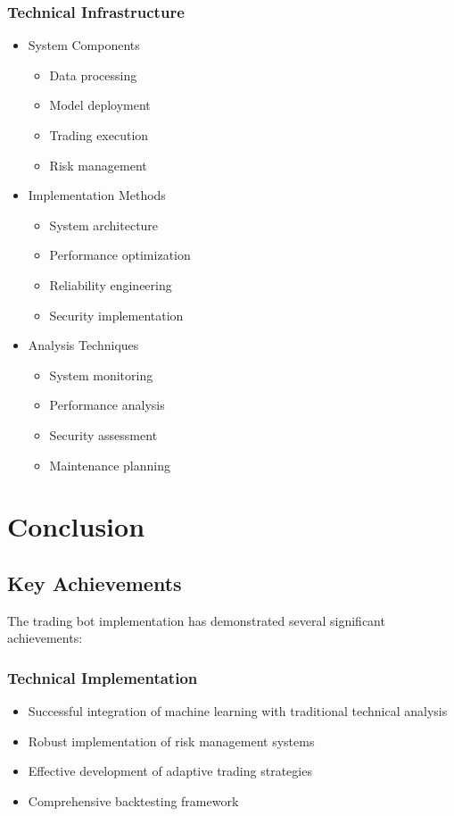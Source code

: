 \documentclass[conference]{IEEEtran}
\begin{document}
\subsubsection{Technical Infrastructure}
\begin{itemize}
    \item System Components
    \begin{itemize}
        \item Data processing
        \item Model deployment
        \item Trading execution
        \item Risk management
    \end{itemize}
    
    \item Implementation Methods
    \begin{itemize}
        \item System architecture
        \item Performance optimization
        \item Reliability engineering
        \item Security implementation
    \end{itemize}
    
    \item Analysis Techniques
    \begin{itemize}
        \item System monitoring
        \item Performance analysis
        \item Security assessment
        \item Maintenance planning
    \end{itemize}
\end{itemize}

\section{Conclusion}
\subsection{Key Achievements}
The trading bot implementation has demonstrated several significant achievements:

\subsubsection{Technical Implementation}
\begin{itemize}
    \item Successful integration of machine learning with traditional technical analysis
    \item Robust implementation of risk management systems
    \item Effective development of adaptive trading strategies
    \item Comprehensive backtesting framework
\end{itemize}
\end{document}
